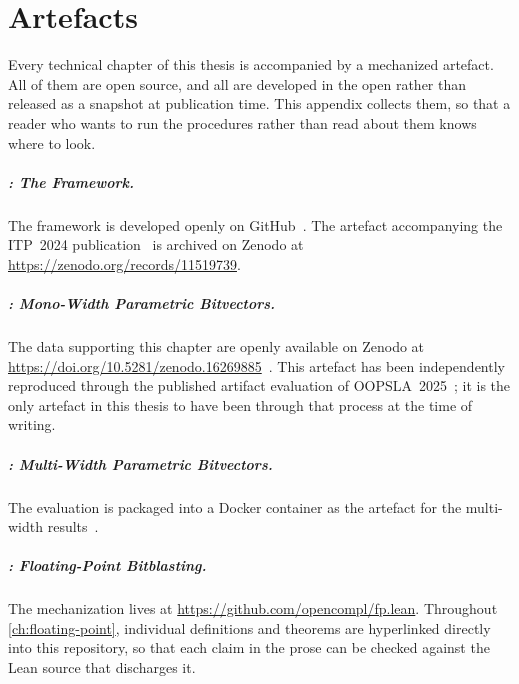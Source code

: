 \chapter{Artefacts}
\label{app:artefacts}

Every technical chapter of this thesis is accompanied by a mechanized artefact.
All of them are open source, and all are developed in the open rather than
released as a snapshot at publication time. This appendix collects them, so that
a reader who wants to run the procedures rather than read about them knows where
to look.

\paragraph{: The  Framework.}
The framework is developed openly on GitHub~\cite{leanmlirgithub}. The artefact
accompanying the ITP~2024 publication~\citep{leanmlir} is archived on Zenodo at
\url{https://zenodo.org/records/11519739}.

\paragraph{: Mono-Width Parametric Bitvectors.}
The data supporting this chapter are openly available on Zenodo at
\url{https://doi.org/10.5281/zenodo.16269885}~\cite{bhat_2025_16269885}. This
artefact has been independently reproduced through the published artifact
evaluation of OOPSLA~2025~\citep{bhat2025certified}; it is the only artefact in
this thesis to have been through that process at the time of writing.

\paragraph{: Multi-Width Parametric Bitvectors.}
The evaluation is packaged into a Docker container as the artefact for the
multi-width results~\citep{bhat2026multiwidth}.

\paragraph{: Floating-Point Bitblasting.}
The mechanization lives at \url{https://github.com/opencompl/fp.lean}. Throughout
\cref{ch:floating-point}, individual definitions and theorems are hyperlinked
directly into this repository, so that each claim in the prose can be checked
against the Lean source that discharges it.
